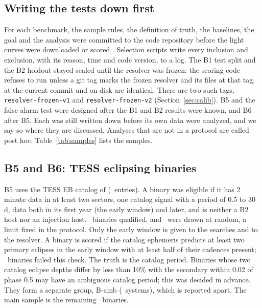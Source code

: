 \documentclass[twocolumn,linenumbers]{aastex701}
\begin{document}
\subsection{Writing the tests down first} \label{sec:prereg}

For each benchmark, the sample rules, the definition of truth, the baselines, the goal and the analysis were committed to the code repository before the light curves were downloaded or scored \citep[preregistration;][]{Nosek2018}. Selection scripts write every inclusion and exclusion, with its reason, time and code version, to a log. The B1 test split and the B2 holdout stayed sealed until the resolver was frozen: the scoring code refuses to run unless a git tag marks the frozen resolver and its files at that tag, at the current commit and on disk are identical. There are two such tags, \texttt{resolver-frozen-v1} and \texttt{resolver-frozen-v2} (Section~\ref{sec:calib}). B5 and the false alarm test were designed after the B1 and B2 results were known, and B6 after B5. Each was still written down before its own data were analyzed, and we say so where they are discussed. Analyses that are not in a protocol are called post hoc. Table~\ref{tab:samples} lists the samples.



\subsection{B5 and B6: TESS eclipsing binaries} \label{sec:b5data}

B5 uses the TESS EB catalog of \citet{Prsa2022} (\bFiveCatRows\ entries). A binary was eligible if it has 2 minute data in at least two sectors, one catalog signal with a period of 0.5 to 30\,d, data both in its first year (the early window) and later, and is neither a B2 host nor an injection host. \bFivePassY\ binaries qualified, and \bFiveIncluded\ were drawn at random, a limit fixed in the protocol. Only the early window is given to the searches and to the resolver. A binary is scored if the catalog ephemeris predicts at least two primary eclipses in the early window with at least half of their cadences present; \bFiveHthreeFail\ binaries failed this check. The truth is the catalog period. Binaries whose two catalog eclipse depths differ by less than 10\% with the secondary within 0.02 of phase 0.5 may have an ambiguous catalog period; this was decided in advance. They form a separate group, B-amb (\bFiveAmbN\ systems), which is reported apart. The main sample is the remaining \bFiveN\ binaries.
\end{document}
